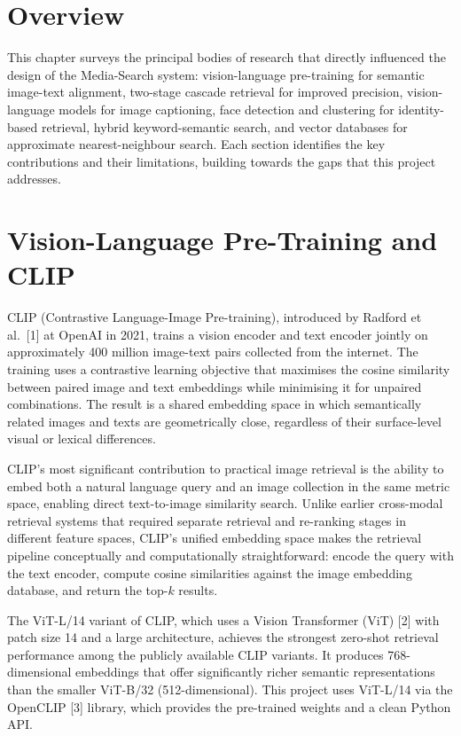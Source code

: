 \documentclass[12pt,a4paper,oneside]{report}
\begin{document}
\section{Overview}

This chapter surveys the principal bodies of research that directly influenced the design of the Media-Search system: vision-language pre-training for semantic image-text alignment, two-stage cascade retrieval for improved precision, vision-language models for image captioning, face detection and clustering for identity-based retrieval, hybrid keyword-semantic search, and vector databases for approximate nearest-neighbour search. Each section identifies the key contributions and their limitations, building towards the gaps that this project addresses.

\section{Vision-Language Pre-Training and CLIP}

CLIP (Contrastive Language-Image Pre-training), introduced by Radford et al.\ [1] at OpenAI in 2021, trains a vision encoder and text encoder jointly on approximately 400 million image-text pairs collected from the internet. The training uses a contrastive learning objective that maximises the cosine similarity between paired image and text embeddings while minimising it for unpaired combinations. The result is a shared embedding space in which semantically related images and texts are geometrically close, regardless of their surface-level visual or lexical differences.

CLIP's most significant contribution to practical image retrieval is the ability to embed both a natural language query and an image collection in the same metric space, enabling direct text-to-image similarity search. Unlike earlier cross-modal retrieval systems that required separate retrieval and re-ranking stages in different feature spaces, CLIP's unified embedding space makes the retrieval pipeline conceptually and computationally straightforward: encode the query with the text encoder, compute cosine similarities against the image embedding database, and return the top-$k$ results.

The ViT-L/14 variant of CLIP, which uses a Vision Transformer (ViT) [2] with patch size 14 and a large architecture, achieves the strongest zero-shot retrieval performance among the publicly available CLIP variants. It produces 768-dimensional embeddings that offer significantly richer semantic representations than the smaller ViT-B/32 (512-dimensional). This project uses ViT-L/14 via the OpenCLIP [3] library, which provides the pre-trained weights and a clean Python API.
\end{document}
